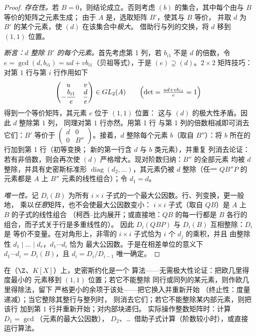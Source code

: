 \begin{proof}
\emph{存在性。}若 $B = 0$，则结论成立。否则考虑
$(b)$ 的集合，其中每个由与 $B$ 等价的矩阵之元素生成；
由于 $A$ 是，选取矩阵 $B'$，使其与 $B$ 等价，
并取 $d$ 为 $B'$ 的某个元素，使 $(d)$ 在该集合中\emph{极大}。
借助行与列的交换，将 $d$ 移到 $(1,1)$ 位置。

\emph{断言：$d$ 整除 $B'$ 的每个元素。}首先考虑第 1 列，若
$b_{i1}$ 不是 $d$ 的倍数，令 $e = \gcd(d, b_{i1}) = ud +
vb_{i1}$（贝祖等式），于是 $(e) \supsetneq (d)$。$2 \times 2$
矩阵技巧：对第 $1$ 行与第 $i$ 行作用如下
\[
\begin{pmatrix} u & v \\ -\dfrac{b_{i1}}e & \dfrac de
\end{pmatrix}
\in GL_2(A)
\qquad
\Bigl(\det = \tfrac{ud + v b_{i1}}e = 1\Bigr)
\]
得到一个等价矩阵，其元素 $e$ 位于 $(1,1)$ 位置：
这与 $(d)$ 的极大性矛盾。因此 $d$ 整除第 $1$ 列，
同理对第 $1$ 行亦然。用第 1 行
与第 1 列的倍数相减即可消去它们：$B'$ 等价于 $\begin{pmatrix} d &
0\\ 0 & B''\end{pmatrix}$。接着，$d$ 整除每个元素 $b$（取自
$B''$）：将 $b$ 所在的行加到第 1 行（初等变换；
新的第一行含 $d$ 与 $b$ 类元素），并重复
列消去论证：若有非倍数，则会再次使
$(d)$ 严格增大。现对阶数归纳：$B''$ 的全部元素
均被 $d$ 整除，并具有史密斯标准形 $\operatorname{diag}(d_2,
\dots)$，其元素仍被 $d$ 整除（任一
$QB''P$ 的元素都是 $A$ 上 $B''$ 元素的线性组合）；令 $d_1 =
d$。

\emph{唯一性。}记 $D_i(B)$ 为所有 $i \times i$
子式的一个最大公因数。行、列变换，更一般地，
乘以\emph{任意}矩阵，也不会使最大公因数变小：
$i \times i$ 子式（取自 $QB$）是 $A$ 上 $B$ 的子式的线性组合
（柯西--比内展开；或直接地：$QB$ 的每一行都是
$B$ 各行的组合，而子式关于行是多重线性的）。
因此 $D_i(QBP)$ 与 $D_i(B)$ 互相整除：$D_i$ 是
等价不变量。在对角形上，非零的 $i
\times i$ 子式恰为 $i$ 个 $d_j$ 的乘积，并且
由整除性 $d_1 \mid \dots \mid d_r$，$d_1 \cdots d_i$ 恰为
最大公因数。于是在相差单位的意义下 $d_1 \cdots d_i = D_i(B)$，且 $d_i =
D_i/D_{i-1}$ 唯一确定。
\end{proof}

\begin{method}\label{met:b3:modules:smith}
在（$\Z$、$K[X]$）上，史密斯约化是一个
算法——无需极大性论证：把欧几里得度最小的
元素移到 $(1,1)$ 位置；若它不能整除
同行或同列的某元素，则作欧几里得除法，留下
严格更小的余项于该处——把它换入并重新开始
（终止性：度量递减）；当它整除其整行与整列时，
则消去它们；若它不能整除某内部元素，则把该行
加到第 $1$ 行并重新开始；对内部块递归。
实际操作整数矩阵时：计算 $D_1 = \gcd$（元素的最大公因数），
$D_2$、\dots\ 借助子式计算（阶数较小时），或直接运行算法。
\end{method}


